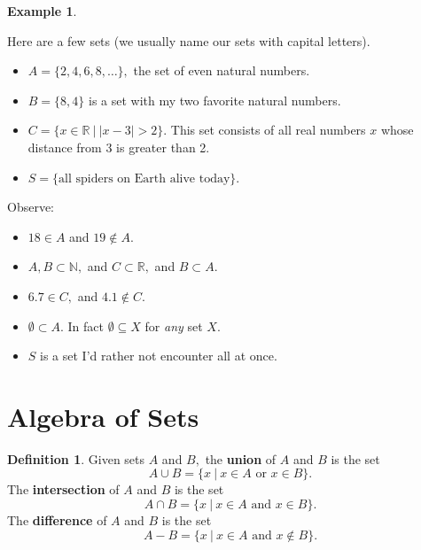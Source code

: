 \documentclass[
]{book}
\providecommand{\tightlist}{%
  \setlength{\itemsep}{0pt}\setlength{\parskip}{0pt}}
\theoremstyle{definition}
\newtheorem{definition}{Definition}[chapter]
\theoremstyle{definition}
\newtheorem{example}{Example}[chapter]
\theoremstyle{definition}
\theoremstyle{definition}
\theoremstyle{remark}
\begin{document}
\begin{example}
\protect\hypertarget{exm:first-sets}{}\label{exm:first-sets}

Here are a few sets (we usually name our sets with capital letters).

\begin{itemize}
\tightlist
\item
  \(A = \{2, 4, 6, 8, \ldots\},\) the set of even natural numbers.
\item
  \(B = \{8,4\}\) is a set with my two favorite natural numbers.
\item
  \(C = \{ x \in \mathbb{R} ~|~ |x-3| > 2 \}.\) This set consists of all real numbers \(x\) whose distance from 3 is greater than 2.
\item
  \(S = \{\text{all spiders on Earth alive today}\}\).
\end{itemize}

Observe:

\begin{itemize}
\tightlist
\item
  \(18 \in A\) and \(19 \notin A\).
\item
  \(A,B \subset \mathbb{N},\) and \(C \subset \mathbb{R},\) and \(B \subset A\).
\item
  \(6.7 \in C,\) and \(4.1 \notin C\).
\item
  \(\emptyset \subset A\). In fact \(\emptyset \subseteq X\) for \emph{any} set \(X\).
\item
  \(S\) is a set I'd rather not encounter all at once.
\end{itemize}

\end{example}

\section{Algebra of Sets}\label{algebra-of-sets}

\begin{definition}
\protect\hypertarget{def:set-algebra}{}\label{def:set-algebra}Given sets \(A\) and \(B,\) the \textbf{union} of \(A\) and \(B\) is the set \[A \cup B = \{x ~|~ x \in A \text{ or } x \in B\}.\]
The \textbf{intersection} of \(A\) and \(B\) is the set \[A \cap B = \{x ~|~ x \in A \text{ and } x \in B \}.\]
The \textbf{difference} of \(A\) and \(B\) is the set
\[A − B = \{x ~|~ x \in A \text{ and } x \notin B\}.\]
\end{definition}
\end{document}
